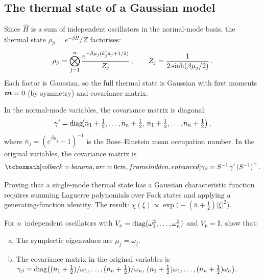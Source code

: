 \subsection{The thermal state of a Gaussian model}%
\label{sec:thermal-state}

Since $\hat{H}$ is a sum of independent oscillators in the
normal-mode basis, the thermal state
$\rho_\beta = e^{-\beta \hat{H}}/Z$ factorises:
\begin{equation}\label{eq:thermal-factorised}
  \rho_\beta
  = \bigotimes_{j=1}^{n} \frac{e^{-\beta\mu_j(\hat{a}_j^\dagger \hat{a}_j + 1/2)}}{Z_j}\,,
  \qquad
  Z_j = \frac{1}{2\sinh(\beta\mu_j/2)}\,.
\end{equation}
Each factor is Gaussian, so the full thermal state is Gaussian with
first moments $\boldsymbol{m} = 0$ (by symmetry) and covariance matrix:

\begin{keyresult}
  In the normal-mode variables, the covariance matrix is diagonal:
  \begin{equation}\label{eq:gamma-prime}
    \gamma'
    = \operatorname{diag}\!\bigl(\bar{n}_1 + \tfrac{1}{2},\ldots,\bar{n}_n + \tfrac{1}{2},\,
      \bar{n}_1 + \tfrac{1}{2},\ldots,\bar{n}_n + \tfrac{1}{2}\bigr)\,,
  \end{equation}
  where $\bar{n}_j = (e^{\beta\mu_j} - 1)^{-1}$ is the Bose--Einstein
  mean occupation number.  In the original variables, the covariance
  matrix is
  \begin{equation}\label{eq:gamma-beta}
    \eqbox{\gamma_\beta = S^{-1}\,\gamma'\,(S^{-1})^\top}\,.
  \end{equation}
\end{keyresult}

\begin{remark}
  Proving that a single-mode thermal state has a Gaussian
  characteristic function requires summing Laguerre polynomials
  over Fock states and applying a generating-function identity.
  The result:
  $\chi(\xi) \propto \exp\!\bigl(-(\bar{n}+\tfrac{1}{2})\lvert\xi\rvert^2\bigr)$.
\end{remark}

\begin{exercise}\label{ex:thermal-covariance}
  For $n$~independent oscillators with $V_x = \operatorname{diag}(\omega_1^2,\ldots,\omega_n^2)$
  and $V_p = \mathbb{I}$, show that:
  \begin{enumerate}[(a)]
    \item The symplectic eigenvalues are $\mu_j = \omega_j$.
    \item The covariance matrix in the original variables is
      $\gamma_\beta = \operatorname{diag}\bigl((\bar{n}_1+\frac{1}{2})/\omega_1,\ldots,
      (\bar{n}_n+\frac{1}{2})/\omega_n,\,
      (\bar{n}_1+\frac{1}{2})\omega_1,\ldots,
      (\bar{n}_n+\frac{1}{2})\omega_n\bigr)$.
  \end{enumerate}
\end{exercise}

